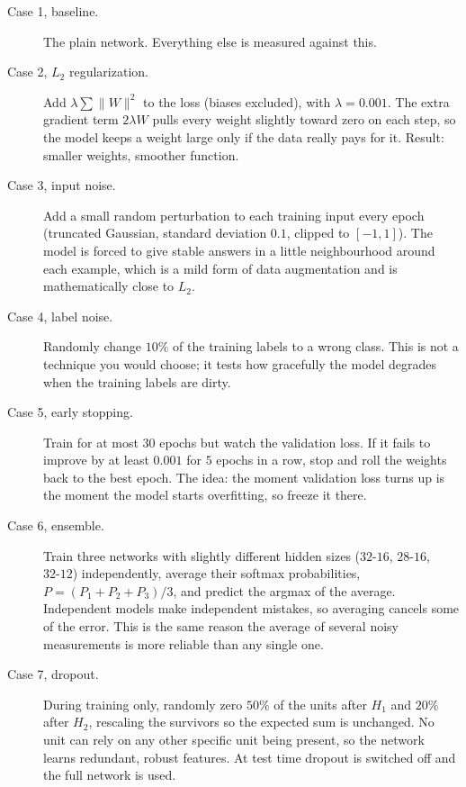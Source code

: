 \documentclass[12pt]{article}
\begin{document}
\begin{description}
\item[Case 1, baseline.] The plain network. Everything else is measured
      against this.
\item[Case 2, $L_2$ regularization.] Add $\lambda \sum \|W\|^2$ to the loss
      (biases excluded), with $\lambda = 0.001$. The extra gradient term
      $2\lambda W$ pulls every weight slightly toward zero on each step, so the
      model keeps a weight large only if the data really pays for it. Result:
      smaller weights, smoother function.
\item[Case 3, input noise.] Add a small random perturbation to each training
      input every epoch (truncated Gaussian, standard deviation $0.1$, clipped
      to $[-1, 1]$). The model is forced to give stable answers in a little
      neighbourhood around each example, which is a mild form of data
      augmentation and is mathematically close to $L_2$.
\item[Case 4, label noise.] Randomly change $10\%$ of the training labels to a
      wrong class. This is not a technique you would choose; it tests how
      gracefully the model degrades when the training labels are dirty.
\item[Case 5, early stopping.] Train for at most 30 epochs but watch the
      validation loss. If it fails to improve by at least $0.001$ for $5$
      epochs in a row, stop and roll the weights back to the best epoch. The
      idea: the moment validation loss turns up is the moment the model starts
      overfitting, so freeze it there.
\item[Case 6, ensemble.] Train three networks with slightly different hidden
      sizes ($32\text{-}16$, $28\text{-}16$, $32\text{-}12$) independently,
      average their softmax probabilities,
      $P = (P_1 + P_2 + P_3)/3$, and predict the argmax of the average.
      Independent models make independent mistakes, so averaging cancels some
      of the error. This is the same reason the average of several noisy
      measurements is more reliable than any single one.
\item[Case 7, dropout.] During training only, randomly zero $50\%$ of the units
      after $H_1$ and $20\%$ after $H_2$, rescaling the survivors so the
      expected sum is unchanged. No unit can rely on any other specific unit
      being present, so the network learns redundant, robust features. At test
      time dropout is switched off and the full network is used.
\end{description}
\end{document}
